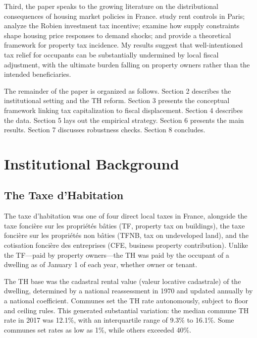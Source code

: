\documentclass[12pt]{article}
\begin{document}
Third, the paper speaks to the growing literature on the distributional consequences of housing market policies in France. \citet{bono2019effect} study rent controls in Paris; \citet{gobillon2012impact} analyze the Robien investment tax incentive; \citet{hilber2016impact} examine how supply constraints shape housing price responses to demand shocks; and \citet{besley2014incidence} provide a theoretical framework for property tax incidence. My results suggest that well-intentioned tax relief for occupants can be substantially undermined by local fiscal adjustment, with the ultimate burden falling on property owners rather than the intended beneficiaries.

The remainder of the paper is organized as follows. Section 2 describes the institutional setting and the TH reform. Section 3 presents the conceptual framework linking tax capitalization to fiscal displacement. Section 4 describes the data. Section 5 lays out the empirical strategy. Section 6 presents the main results. Section 7 discusses robustness checks. Section 8 concludes.


\section{Institutional Background}

\subsection{The Taxe d'Habitation}

The taxe d'habitation was one of four direct local taxes in France, alongside the taxe fonci\`ere sur les propri\'et\'es b\^aties (TF, property tax on buildings), the taxe fonci\`ere sur les propri\'et\'es non b\^aties (TFNB, tax on undeveloped land), and the cotisation fonci\`ere des entreprises (CFE, business property contribution). Unlike the TF---paid by property owners---the TH was paid by the occupant of a dwelling as of January 1 of each year, whether owner or tenant.

The TH base was the cadastral rental value (valeur locative cadastrale) of the dwelling, determined by a national reassessment in 1970 and updated annually by a national coefficient. Communes set the TH rate autonomously, subject to floor and ceiling rules. This generated substantial variation: the median commune TH rate in 2017 was 12.1\%, with an interquartile range of 9.3\% to 16.1\%. Some communes set rates as low as 1\%, while others exceeded 40\%.
\end{document}
